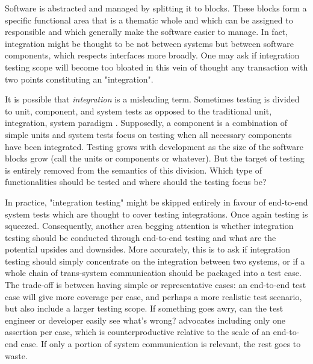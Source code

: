 \documentclass[12pt,a4paper,oneside,pdftex]{report}
\begin{document}
{%
Software is abstracted and managed by splitting it to blocks. These blocks form a specific functional area that is a thematic whole and which can be assigned to responsible and which generally make the software easier to manage. In fact, integration might be thought to be not between systems but between software components, which respects interfaces more broadly. One may ask if integration testing scope will become too bloated in this vein of thought any transaction with two points constituting an "integration".

It is possible that \emph{integration} is a misleading term. Sometimes testing is divided to unit, component, and system tests as opposed to the traditional unit, integration, system paradigm \citep{myers1976software, pezze2008software}. Supposedly, a component is a combination of simple units and system tests focus on testing when all necessary components have been integrated. Testing grows with development as the size of the software blocks grow (call the units or components or whatever). But the target of testing is entirely removed from the semantics of this division. Which type of functionalities should be tested and where should the testing focus be?

In practice, "integration testing" might be skipped entirely in favour of end-to-end system tests which are thought to cover testing integrations. Once again testing is squeezed. Consequently, another area begging attention is whether integration testing should be conducted through end-to-end testing and what are the potential upsides and downsides. More accurately, this is to ask if integration testing should simply concentrate on the integration between two systems, or if a whole chain of trans-system communication should be packaged into a test case. The trade-off is between having simple or representative cases: an end-to-end test case will give more coverage per case, and perhaps a more realistic test scenario, but also include a larger testing scope. If something goes awry, can the test engineer or developer easily see what's wrong? \citep{duvall2007continuous} advocates including only one assertion per case, which is counterproductive relative to the scale of an end-to-end case. If only a portion of system communication is relevant, the rest goes to waste.

}
\end{document}
